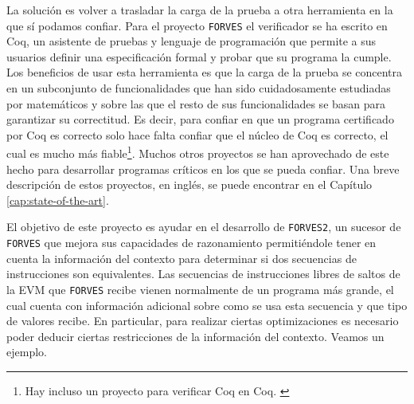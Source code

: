 La solución es volver a trasladar la carga de la prueba a otra herramienta en la que
sí podamos confiar. Para el proyecto \verb|FORVES| el verificador se ha escrito en
Coq, un asistente de pruebas y lenguaje de programación que permite a sus usuarios
definir una especificación formal y probar que su programa la cumple. Los beneficios
de usar esta herramienta es que la carga de la prueba se concentra en un subconjunto
de funcionalidades que han sido cuidadosamente estudiadas por matemáticos y sobre las
que el resto de sus funcionalidades se basan para garantizar su correctitud. Es
decir, para confiar en que un programa certificado por Coq es correcto solo hace falta
confiar que el núcleo de Coq es correcto, el cual es mucho más fiable\footnote{
Hay incluso un proyecto para verificar Coq en Coq. \cite{sozeau:hal-04077552}
}. Muchos otros proyectos se han aprovechado de este hecho para desarrollar programas 
críticos en los que se pueda confiar\cite{...}. Una breve descripción de estos proyectos, 
en inglés, se puede encontrar en el Capítulo \ref{cap:state-of-the-art}.

El objetivo de este proyecto es ayudar en el desarrollo de \verb|FORVES2|, un sucesor
de \verb|FORVES| que mejora sus capacidades de razonamiento permitiéndole tener en
cuenta la información del contexto para determinar si dos secuencias de instrucciones
son equivalentes. Las secuencias de instrucciones libres de saltos de la EVM que 
\verb|FORVES| recibe vienen normalmente de un programa más grande, el cual cuenta con
información adicional sobre como se usa esta secuencia y que tipo de valores recibe.
En particular, para realizar ciertas optimizaciones es necesario poder deducir ciertas
restricciones de la información del contexto. Veamos un ejemplo.

\begin{center}
\end{center}

